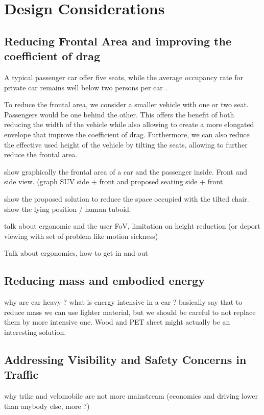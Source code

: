 \section{Design Considerations}

\subsection{Reducing Frontal Area and improving the coefficient of drag}

A typical passenger car offer five seats, while the average occupancy rate for private car remains well below two persons per car \cite{ceu_move_study_2022}.

To reduce the frontal area, we consider a smaller vehicle with one or two seat. Passengers would be one behind the other. This offers the benefit of both reducing the width of the vehicle while also allowing to create a more elongated envelope that improve the coefficient of drag. Furthermore, we can also reduce the effective used height of the vehicle by tilting the seats, allowing to further reduce the frontal area.

show graphically the frontal area of a car and the passenger inside. Front and side view. (graph SUV side + front and proposed seating side + front

show the proposed solution to reduce the space occupied with the tilted chair. show the lying position / human tuboid.

talk about ergonomic and the user FoV, limitation on height reduction (or deport viewing with set of problem like motion sickness)

Talk about ergonomics, how to get in and out
\subsection{Reducing mass and embodied energy}
why are car heavy ? what is energy intensive in a car ?
basically say that to reduce mass we can use lighter material, but we should be careful to not replace them by more intensive one. Wood and PET sheet might actually be an interesting solution.

\subsection{Addressing Visibility and Safety Concerns in Traffic}

why trike and velomobile are not more mainstream (economics and  driving lower than anybody else, more ?)

